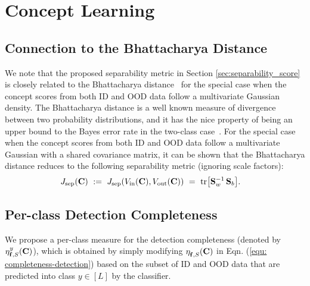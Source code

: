 \section{Concept Learning}
\label{sec:appendix-A}
\subsection{Connection to the Bhattacharya Distance}
\label{sec:appendix-BC-distance}
We note that the proposed separability metric in Section \ref{sec:separability_score} is closely related to the Bhattacharya distance~\cite{bhattacharyya1943measure} for the special case when the concept scores from both ID and OOD data follow a multivariate Gaussian density. The Bhattacharya distance is a well known measure of divergence between two probability distributions, and it has the nice property of being an upper bound to the Bayes error rate in the two-class case~\cite{fukunaga1990bhatta}. For the special case when the concept scores from both ID and OOD data follow a multivariate Gaussian with a shared covariance matrix, it can be shown that the Bhattacharya distance reduces to the following separability metric (ignoring scale factors): 
\begin{align}
\label{eq:separability_trace}
&J_{\textrm{sep}}(\bfC) ~:=~ J_{\textrm{sep}}(V_{\textrm{in}}(\bfC), V_{\textrm{out}}(\bfC)) ~=~ \textrm{tr}\big[\bfS_w^{-1} \,\bfS_b\big].
%
%
\end{align}

\subsection{Per-class Detection Completeness}
\label{sec:appendix-perclass-completeness}
We propose a per-class measure for the detection completeness (denoted by $\eta^{y}_{\mathbf{f}, S}(\mathbf{C})$), which is obtained by simply modifying $\eta^{}_{\mathbf{f}, S}(\mathbf{C})$ in Eqn. (\ref{equ: completeness-detection}) based on the subset of ID and OOD data that are predicted into class $y \in [L]$ by the classifier.

